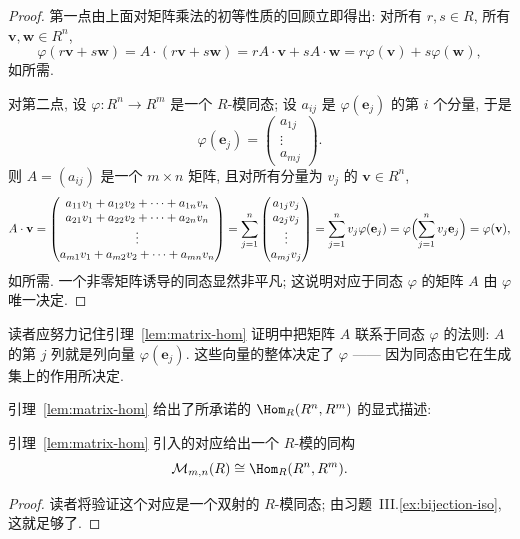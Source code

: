 \begin{proof}
第一点由上面对矩阵乘法的初等性质的回顾立即得出: 对所有 $r,s\in R$, 所有 $\mathbf{v},\mathbf{w}\in R^n$,
\[
\varphi(r\mathbf{v}+s\mathbf{w}) = A\cdot(r\mathbf{v}+s\mathbf{w}) = rA\cdot\mathbf{v}+sA\cdot\mathbf{w} = r\varphi(\mathbf{v})+s\varphi(\mathbf{w}),
\]
如所需.

对第二点, 设 $\varphi:R^n\to R^m$ 是一个 $R$-模同态; 设 $a_{ij}$ 是 $\varphi(\mathbf{e}_j)$ 的第 $i$ 个分量, 于是
\[
\varphi(\mathbf{e}_j) = \begin{pmatrix} a_{1j}\\ \vdots\\ a_{mj}\end{pmatrix}.
\]
则 $A=(a_{ij})$ 是一个 $m\times n$ 矩阵, 且对所有分量为 $v_j$ 的 $\mathbf{v}\in R^n$,
\[
A\cdot\mathbf{v} = \begin{pmatrix}
a_{11}v_1+a_{12}v_2+\dots+a_{1n}v_n\\
a_{21}v_1+a_{22}v_2+\dots+a_{2n}v_n\\
\vdots\\
a_{m1}v_1+a_{m2}v_2+\dots+a_{mn}v_n
\end{pmatrix}
= \sum_{j=1}^{n}\begin{pmatrix} a_{1j}v_j\\ a_{2j}v_j\\ \vdots\\ a_{mj}v_j\end{pmatrix}
= \sum_{j=1}^{n} v_j\varphi(\mathbf{e}_j)
= \varphi\Bigl(\sum_{j=1}^{n}v_j\mathbf{e}_j\Bigr) = \varphi(\mathbf{v}),
\]
如所需. 一个非零矩阵诱导的同态显然非平凡; 这说明对应于同态 $\varphi$ 的矩阵 $A$ 由 $\varphi$ 唯一决定.
\end{proof}

读者应努力记住引理~\ref{lem:matrix-hom} 证明中把矩阵 $A$ 联系于同态 $\varphi$ 的法则: $A$ 的第 $j$ 列就是列向量 $\varphi(\mathbf{e}_j)$. 这些向量的整体决定了 $\varphi$ —— 因为同态由它在生成集上的作用所决定.

引理~\ref{lem:matrix-hom} 给出了所承诺的 $\Hom_R(R^n,R^m)$ 的显式描述:

\begin{corollary}\label{cor:matrix-hom-isomorphism}
引理~\ref{lem:matrix-hom} 引入的对应给出一个 $R$-模的同构
\[
\mathcal{M}_{m,n}(R) \cong \Hom_R(R^n,R^m).
\]
\end{corollary}

\begin{proof}
读者将验证这个对应是一个双射的 $R$-模同态; 由习题~III.\ref{ex:bijection-iso}, 这就足够了.
\end{proof}

